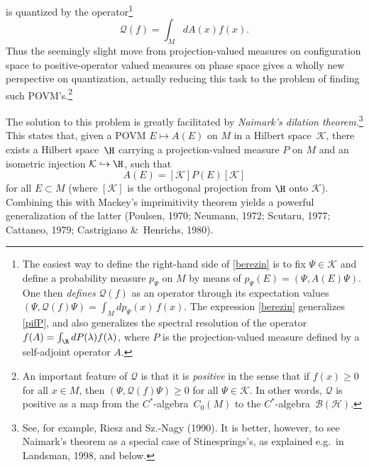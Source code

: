 \documentclass[12pt,titlepage]{article}
\newcommand{\beq}{\begin{equation}}
\newcommand{\eeq}{\end{equation}}
\newcommand{\ca}{$C^*$-algebra} \newcommand{\jba}{JB-algebra}
\newcommand{\Hs}{Hilbert space} \newcommand{\Bs}{Banach space}
\newcommand{\hraw}{\hookrightarrow} \newcommand{\Law}{\Leftarrow}
\newcommand{\BH}{\mathcal{B}({\mathcal H})} \newcommand{\diri}{\int^{\oplus}}
\newcommand{\er}{\eqref}
\newcommand{\lm}{\lambda} \newcommand{\Lm}{\Lambda}
\newcommand{\CK}{{\mathcal K}}   \newcommand{\CL}{{\mathcal L}}
\newcommand{\CQ}{{\mathcal Q}} \newcommand{\CR}{{\mathcal R}}
\begin{document}
is quantized by the operator\footnote{The easiest way to define the right-hand side of \er{berezin} is to fix $\Psi\in\CK$ and define a probability measure $p_{\Psi}$ on $M$ by means of $p_{\Psi}(E)=(\Psi,A(E)\Psi)$.
One then {\it defines} $\CQ(f)$ as an operator through its expectation values
$(\Psi, \CQ(f)\Psi)=\int_M dp_{\Psi}(x)\, f(x)$. The expression \er{berezin} generalizes \er{pifP}, and also generalizes the spectral resolution of the operator $f(A)= \int_{\R} dP(\lm) f(\lm)$, where $P$ is the projection-valued measure defined by a self-adjoint operator $A$.  } 
\beq
\CQ(f)=\int_M dA(x) f(x). \label{berezin}
\eeq
Thus the seemingly slight move from projection-valued measures on configuration space to  positive-operator valued measures on phase space gives a wholly new perspective on quantization, actually  reducing this task to the problem of finding such POVM's.\footnote{An important feature of $\CQ$ is that it is {\it positive} in the sense that if $f(x)\geq 0$ for all $x\in M$, then $(\Psi,\CQ(f)\Psi)\geq 0$ for all $\Psi\in\CK$. In other words, $\CQ$ is positive as a map from the \ca\ $C_0(M)$ to the \ca\ $\BH$.\label{BQP}}

 The solution to this problem is greatly facilitated by {\it Naimark's dilation theorem}.\footnote{See, for example, Riesz and  Sz.-Nagy (1990). It is better, however, to see  Naimark's theorem as a special case of Stinesprings's, as explained e.g.\ in Landsman, 1998, and below.}  This states that, given a POVM $E \mapsto A(E)$ on $M$ in a \Hs\ $\CK$, there exists a \Hs\ $\H$
carrying a projection-valued measure $P$ on $M$ and an isometric injection $\CK\hraw\H$,
such that \beq A(E)=[\CK]P(E)[\CK] \label{AEP} \eeq for all $E\subset M$ (where $[\CK]$ is the orthogonal projection from $\H$ onto $\CK$). Combining this with Mackey's imprimitivity theorem yields a powerful  generalization of the latter (Poulsen, 1970; Neumann, 1972;  Scutaru, 1977; Cattaneo, 1979; Castrigiano \&\
Henrichs, 1980).  
\end{document}
